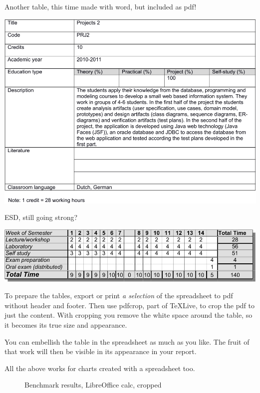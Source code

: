 \begin{table}
  \caption{Another table, this time made with word, but included as pdf!}
\includegraphics[width=\linewidth]{tables/md_prj2-crop.pdf}   
\end{table}

\begin{table}
  \caption{ESD, still going strong?}
\includegraphics{tables/timetable-crop.pdf}
\end{table}


To prepare the tables, export or print \textit{a selection} of the spreadsheet to pdf without header and footer.
Then use pdfcrop, part of TeXLive, to crop the pdf to just the content. With cropping you remove the white space around the table, so it becomes its true size and appearance.

You can embellish the table in the spreadsheet as much as you like. The fruit of that work will then be visible in its appearance in your report.

All the above works for charts created with a spreadsheet too.

\begin{figure}
  \centering
{}
  \caption{Benchmark results, LibreOffice calc, cropped}
\end{figure}



